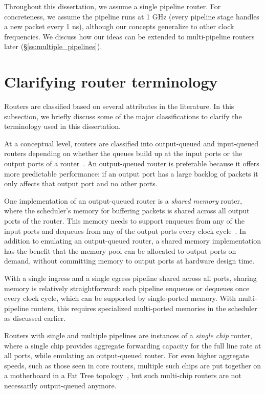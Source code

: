 Throughout this dissertation, we assume a single pipeline router. For
concreteness, we assume the pipeline runs at 1 GHz (\ie every pipeline stage
handles a new packet every 1 ns), although our concepts generalize to other
clock frequencies. We discuss how our ideas can be extended to multi-pipeline
routers later (\S\ref{ss:multiple_pipelines}).

\section{Clarifying router terminology}

Routers are classified based on several attributes in the literature. In this
subsection, we briefly discuss some of the major classifications to clarify the
terminology used in this dissertation.

At a conceptual level, routers are classified into output-queued and
input-queued routers depending on whether the queues build up at the input
ports or the output ports of a router~\cite{karol}. An output-queued router is
preferable because it offers more predictable performance: if an output port
has a large backlog of packets it only affects that output port and no other
ports.

One implementation of an output-queued router is a {\em shared memory} router,
where the scheduler's memory for buffering packets is shared across all output
ports of the router. This memory needs to support enqueues from any of the
input ports and dequeues from any of the output ports every clock
cycle~\cite{sundar_shared_memory, dctcp}.  In addition to emulating an
output-queued router, a shared memory implementation has the benefit that the
memory pool can be allocated to output ports on demand, without
committing memory to output ports at
hardware design time.

With a single ingress and a single egress pipeline shared across all ports,
sharing memory is relatively straightforward: each pipeline enqueues or
dequeues once every clock cycle, which can be supported by single-ported
memory. With multi-pipeline routers, this requires specialized multi-ported
memories in the scheduler as discussed earlier. 

Routers with single and multiple pipelines are instances of a {\em single chip}
router, where a single chip provides aggregate forwarding capacity for the full
line rate at all ports, while emulating an output-queued router. For even
higher aggregate speeds, such as those seen in core routers, multiple such
chips are put together on a motherboard in a Fat Tree topology~\cite{b4}, but
such multi-chip routers are not necessarily output-queued anymore.

